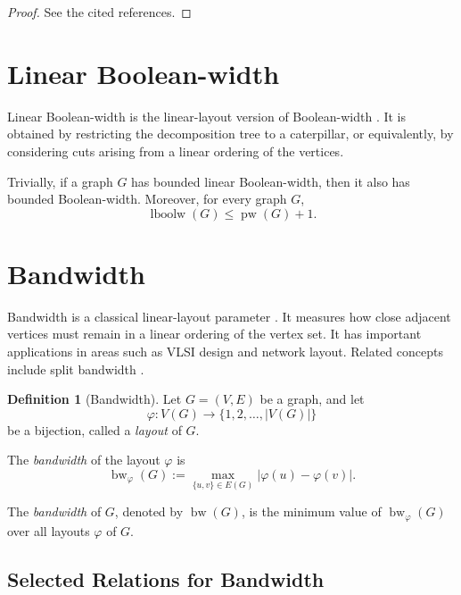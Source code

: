 \documentclass[10pt]{book}
\theoremstyle{definition}
\newtheorem{definition}[theorem]{Definition}
\DeclareMathOperator{\pw}{pw}
\begin{document}
\begin{proof}
See the cited references.
\end{proof}

\section{Linear Boolean-width}

Linear Boolean-width is the linear-layout version of Boolean-width \cite{35}.  
It is obtained by restricting the decomposition tree to a caterpillar, or equivalently, by considering cuts arising from a linear ordering of the vertices.

Trivially, if a graph \(G\) has bounded linear Boolean-width, then it also has bounded Boolean-width.  
Moreover, for every graph \(G\),
\[
\operatorname{lboolw}(G)\leq \pw(G)+1.
\]
\cite{348}

\section{Bandwidth}

Bandwidth is a classical linear-layout parameter \cite{259,260}.  
It measures how close adjacent vertices must remain in a linear ordering of the vertex set.  
It has important applications in areas such as VLSI design and network layout.  
Related concepts include split bandwidth \cite{322}.

\begin{definition}[Bandwidth]
\cite{259,260}
Let \(G=(V,E)\) be a graph, and let
\[
\varphi:V(G)\to \{1,2,\dots,|V(G)|\}
\]
be a bijection, called a \emph{layout} of \(G\).

The \emph{bandwidth} of the layout \(\varphi\) is
\[
\operatorname{bw}_{\varphi}(G):=
\max_{\{u,v\}\in E(G)} |\varphi(u)-\varphi(v)|.
\]

The \emph{bandwidth} of \(G\), denoted by \(\operatorname{bw}(G)\), is the minimum value of
\(\operatorname{bw}_{\varphi}(G)\) over all layouts \(\varphi\) of \(G\).
\end{definition}

\subsection{Selected Relations for Bandwidth}
\end{document}
